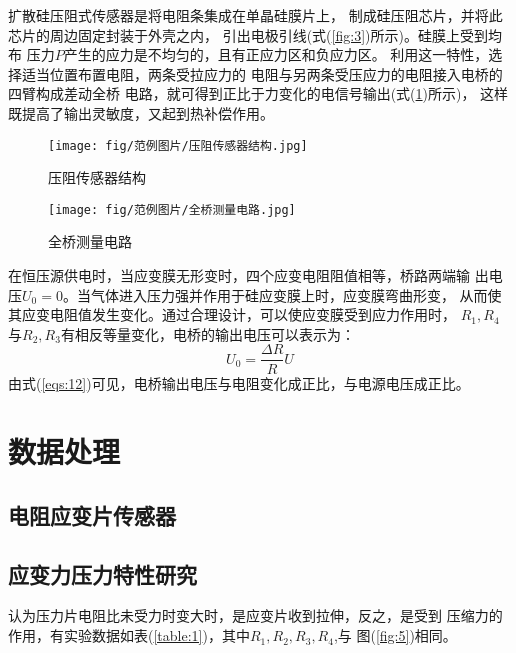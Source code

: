 \documentclass[a4paper,UTF8]{ctexart}
\begin{document}
    扩散硅压阻式传感器是将电阻条集成在单晶硅膜片上，
制成硅压阻芯片，并将此芯片的周边固定封装于外壳之内，
引出电极引线(式(\ref*{fig:3})所示)。硅膜上受到均布
压力$P$产生的应力是不均匀的，且有正应力区和负应力区。
利用这一特性，选择适当位置布置电阻，两条受拉应力的
电阻与另两条受压应力的电阻接入电桥的四臂构成差动全桥
电路，就可得到正比于力变化的电信号输出(式(\ref*{fig:4})所示)，
这样既提高了输出灵敏度，又起到热补偿作用。
\begin{figure}[!hp]
    \centering
    \begin{minipage}{200pt}
        \centering
        \texttt{[image: fig/范例图片/压阻传感器结构.jpg]}
        \caption{压阻传感器结构}
        \label{fig:3}
    \end{minipage}
    \begin{minipage}{200pt}
        \centering
        \texttt{[image: fig/范例图片/全桥测量电路.jpg]}
        \caption{全桥测量电路}
        \label{fig:4}
    \end{minipage}
\end{figure}

    在恒压源供电时，当应变膜无形变时，四个应变电阻阻值相等，桥路两端输
出电压$U_0=0$。当气体进入压力强并作用于硅应变膜上时，应变膜弯曲形变，
从而使其应变电阻值发生变化。通过合理设计，可以使应变膜受到应力作用时， 
$R_1,R_4$与$R_2,R_3$有相反等量变化，电桥的输出电压可以表示为：
\begin{equation}
    U_0=\frac{\Delta R}{R}U
    \label{eqs:12}
\end{equation}
由式(\ref*{eqs:12})可见，电桥输出电压与电阻变化成正比，与电源电压成正比。

\section{数据处理}
{\centering\subsection*{电阻应变片传感器}}
\subsection*{应变力压力特性研究}
    认为压力片电阻比未受力时变大时，是应变片收到拉伸，反之，是受到
压缩力的作用，有实验数据如表(\ref*{table:1})，其中$R_1,R_2,R_3,R_4$,与
图(\ref*{fig:5})相同。
\end{document}
